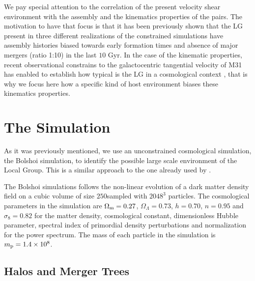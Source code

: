 \documentclass[usenatbib]{latex/mn2e}
\begin{document}
We pay special attention to the correlation of the present velocity shear 
environment with the assembly and the kinematics properties of the pairs. 
The motivation to have that focus is that it has been previously shown 
that the LG present in three different realizations of the constrained 
simulations have assembly histories biased towards early formation times 
and absence of major mergers (ratio 1:10) in the last $10$ Gyr. In the 
case of the kinematic properties, recent observational constrains to the 
galactocentric tangential velocity of M31 has enabled to establish how 
typical is the LG in a cosmological context , that is why we focus here how a specific kind 
of host environment biases these kinematics properties.



\section{The Simulation}
\label{sec:the_simulation}


As it was previously mentioned, we use an unconstrained cosmological 
simulation, the Bolshoi simulation, to identify the possible large scale 
environment of the Local Group. This is a similar approach to the one already 
used by .



The Bolshoi simulations follows the non-linear evolution of a dark matter 
density field on a cubic volume of size $250$\hMpc sampled with $2048^3$ 
particles. The cosmological parameters in the simulation are 
$\Omega_{\rm m}=0.27$, $\Omega_{\Lambda}=0.73$, $h=0.70$, $n=0.95$ and 
$\sigma_{8}=0.82$ for the matter density, cosmological constant, 
dimensionless Hubble parameter, spectral index of primordial density 
perturbations and normalization for the power spectrum. The mass of each 
particle in the simulation is $m_{\rm p}=1.4\times 10^{8}$\hMsun.



\subsection{Halos and Merger Trees}
\label{subsec:halos_merger_trees}
\end{document}
